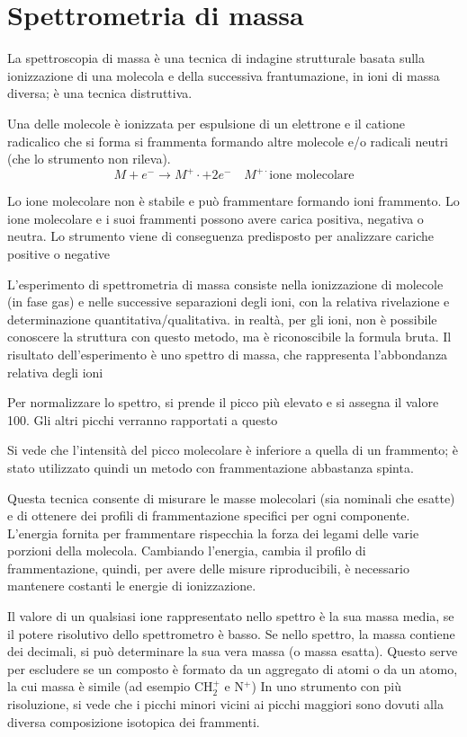 \chapter{Spettrometria di massa}
La spettroscopia di massa è una tecnica di indagine strutturale basata sulla ionizzazione di una molecola e della successiva frantumazione, in ioni di massa diversa;
è una tecnica distruttiva.

Una delle molecole è ionizzata per espulsione di un elettrone e il catione radicalico che si forma si frammenta formando altre molecole e/o radicali neutri (che lo strumento non rileva).
\[
M + e^- \rightarrow M^+\cdot + 2e^- \quad M^{+\cdot} \text{ione molecolare}
\]

Lo ione molecolare non è stabile e può frammentare formando ioni frammento.
Lo ione molecolare e i suoi frammenti possono avere carica positiva, negativa o neutra.
Lo strumento viene di conseguenza predisposto per analizzare cariche positive o negative


L'esperimento di spettrometria di massa consiste nella ionizzazione di molecole (in fase gas) e nelle successive separazioni degli ioni, con la relativa rivelazione e determinazione quantitativa/qualitativa.
in realtà, per gli ioni, non è possibile conoscere la struttura con questo metodo, ma è riconoscibile la formula bruta.
Il risultato dell'esperimento è uno spettro di massa, che rappresenta l'abbondanza relativa degli ioni

Per normalizzare lo spettro, si prende il picco più elevato e si assegna il valore 100.
Gli altri picchi verranno rapportati a questo

Si vede che l'intensità del picco molecolare è inferiore a quella di un frammento;
è stato utilizzato quindi un metodo con frammentazione abbastanza spinta.


Questa tecnica consente di misurare le masse molecolari (sia nominali che esatte) e di ottenere dei profili di frammentazione specifici per ogni componente.
L'energia fornita per frammentare rispecchia la forza dei legami delle varie porzioni della molecola.
Cambiando l'energia, cambia il profilo di frammentazione, quindi, per avere delle misure riproducibili, è necessario mantenere costanti le energie di ionizzazione.

Il valore di un qualsiasi ione rappresentato nello spettro è la sua massa media, se il potere risolutivo dello spettrometro è basso.
Se nello spettro, la massa contiene dei decimali, si può determinare la sua vera massa (o massa esatta).
Questo serve per escludere se un composto è formato da un aggregato di atomi o da un atomo, la cui massa è simile (ad esempio CH$_2^+$ e N$^+$)
In uno strumento con più risoluzione, si vede che i picchi minori vicini ai picchi maggiori sono dovuti alla diversa composizione isotopica dei frammenti.

